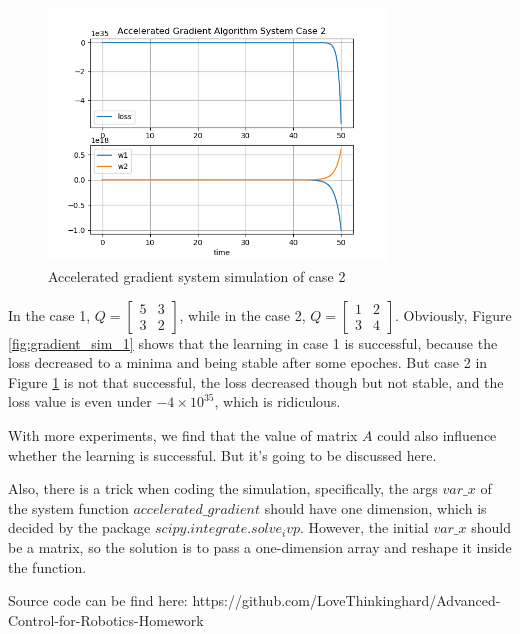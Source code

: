 \documentclass{article}
\begin{document}
\begin{figure}[htbp]
    \centering
    \includegraphics[width=0.8\textwidth]{img/accelerated_gradient_simulation_case_2.png}
    \caption{Accelerated gradient system simulation of case 2}
    \label{fig:gradient_sim_2}
\end{figure}

In the case 1, $Q=\begin{bmatrix} 5&3\\3&2 \end{bmatrix}$,
while in the case 2, $Q=\begin{bmatrix} 1&2\\3&4 \end{bmatrix}$.
Obviously, Figure \ref{fig:gradient_sim_1} shows that the learning in case 1 is successful,
because the loss decreased to a minima and being stable after some epoches.
But case 2 in Figure \ref{fig:gradient_sim_2} is not that successful,
the loss decreased though but not stable, and the loss value is even under $-4\times 10^{35}$,
which is ridiculous.

With more experiments, we find that the value of matrix $A$ could also influence
whether the learning is successful. But it's going to be discussed here.

Also, there is a trick when coding the simulation, specifically,
the args $var\_x$ of the system function $accelerated\_gradient$
should have one dimension, which is decided by the package $scipy.integrate.solve_ivp$.
However, the initial $var\_x$ should be a matrix, so the solution is to pass a
one-dimension array and reshape it inside the function.

Source code can be find here: https://github.com/LoveThinkinghard/Advanced-Control-for-Robotics-Homework
\end{document}
